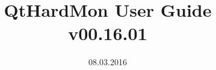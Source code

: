 \documentclass[12pt, a4paper]{report}
\begin{document}
\title{QtHardMon User Guide \\ 
\large v00.16.01}
\date{08.03.2016}
\maketitle
\tableofcontents


\begin{appendices}

\end{appendices}
\end{document}
